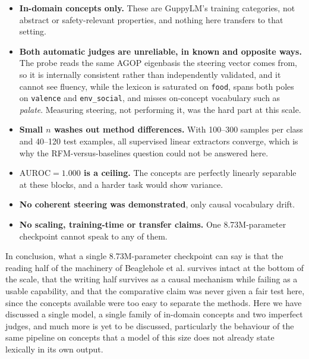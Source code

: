 \begin{itemize}
  \item \textbf{In-domain concepts only.} These are GuppyLM's training categories, not
  abstract or safety-relevant properties, and nothing here transfers to that setting.
  \item \textbf{Both automatic judges are unreliable, in known and opposite ways.} The
  probe reads the same AGOP eigenbasis the steering vector comes from, so it is internally
  consistent rather than independently validated, and it cannot see fluency, while the lexicon
  is saturated on \verb|food|, spans both poles on \verb|valence| and \verb|env_social|,
  and misses on-concept vocabulary such as \emph{palate}. Measuring steering, not
  performing it, was the hard part at this scale.
  \item \textbf{Small $n$ washes out method differences.} With 100--300 samples per class
  and 40--120 test examples, all supervised linear extractors converge, which is why the
  RFM-versus-baselines question could not be answered here.
  \item \textbf{$\mathrm{AUROC} = 1.000$ is a ceiling.} The concepts are perfectly
  linearly separable at these blocks, and a harder task would show variance.
  \item \textbf{No coherent steering was demonstrated}, only causal vocabulary drift.
  \item \textbf{No scaling, training-time or transfer claims.} One 8.73M-parameter
  checkpoint cannot speak to any of them.
\end{itemize}

In conclusion, what a single 8.73M-parameter checkpoint can say is that the reading half
of the machinery of Beaglehole et al. survives intact at the bottom of the scale, that the
writing half survives as a causal mechanism while failing as a usable capability, and that
the comparative claim was never given a fair test here, since the concepts available were
too easy to separate the methods. Here we have discussed a single model, a single family
of in-domain concepts and two imperfect judges, and much more is yet to be discussed,
particularly the behaviour of the same pipeline on concepts that a model of this size does
not already state lexically in its own output.
